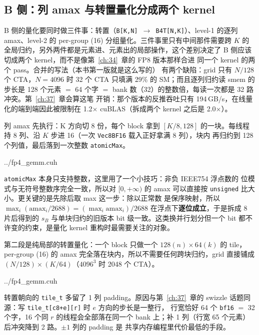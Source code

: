 \subsection{B 侧：列 amax 与转置量化分成两个 kernel}

B 侧的量化要同时做三件事：转置（\texttt{B[K,N] $\to$ B4T[N,K]}）、level-1
的逐列 amax、level-2 的 per-group (16) 分组量化。三件事里只有中间那件需要跨 $K$
的全局归约，另外两件都是元素进、元素出的局部操作，这个差别决定了
B 侧应该切成两个 kernel，而不是像第~\ref{ch:34}~章的 FP8 版本那样合进
同一个 kernel 的两个 pass。合并的写法（本书第一版就是这么写的）
有两个缺陷：grid 只有 $N/128$ 个 CTA，$N{=}4096$ 时 32 个 CTA 只填满
29\% 的 SM；而且逐列归约读 smem 的步长是 128 个元素 $=$ 64 个字 $=$
bank 数（32）的整数倍，每读一次都是 32 路冲突。第~\ref{ch:37}~章会算这笔
开销：那个版本的反推吞吐只有 194\,GB/s，在线量化的端到端因此被限制在
1.2$\times$ cuBLAS（拆成两个 kernel 之后是 2.0$\times$）。

列 amax 先执行：K 方向切 8 份，每个 block 拿到 $[K/8, 128]$ 的一块。每线程
持 8 列、沿 $K$ 步进 16（一次 \texttt{Vec8BF16} 载入正好拿满 8 列），块内
再归约到 128 个列值，最后落到一次整数 \texttt{atomicMax}。

\begin{lstinputlisting}[linerange={243-285},firstnumber=auto,
  title={fp4\_gemm.cuh L243-285（列 amax：分片 + 整数 atomicMax）}]{../fp4_gemm.cuh}
\end{lstinputlisting}

\texttt{atomicMax} 本身只支持整数，这里用了一个小技巧：非负 IEEE754 浮点数的
位模式与无符号整数序完全一致，所以对 $[0, +\infty)$ 的 amax 可以直接按
\texttt{unsigned} 比大小。更关键的是先除后取 max 这一步：除以正常数
是保序映射，所以 $\max_i(\mathrm{amax}_i/2688) = (\max_i \mathrm{amax}_i)/2688$
在浮点下\textbf{逐位成立}，于是拆成 8 片后得到的 $s_B$ 与单块归约的旧版本
bit 级一致。这类换并行划分但一个 bit 都不许变的约束，是量化 kernel
重构时最需要关注的对象。

第二段是纯局部的转置量化：一个 block 只做一个 $128(n)\times64(k)$ 的 tile，
per-group (16) 的 amax 完全落在块内，所以不需要任何跨块归约，grid 直接铺成
$(N/128)\times(K/64)$（$4096^3$ 时 2048 个 CTA）。

\begin{lstinputlisting}[linerange={287-365},firstnumber=auto,
  title={fp4\_gemm.cuh L287-365（转置量化：grid 映射与双朝向 staging）}]{../fp4_gemm.cuh}
\end{lstinputlisting}

转置朝向的 \texttt{tile\_t} 多留了 1 列 padding。原因与第~\ref{ch:37}~章的
swizzle 话题同源：写 \texttt{tile\_t[c8+e][r]} 时 $e$ 方向的步长是一整行，
行宽恰好 64 个 \texttt{bf16} $=$ 32 个字，16 个同 $r$ 的线程会全部落在同一个
bank 上；补 1 列（行宽 65 个元素）后冲突降到 2 路。$\pm1$ 列的 padding 是
共享内存编程里代价最低的手段。

